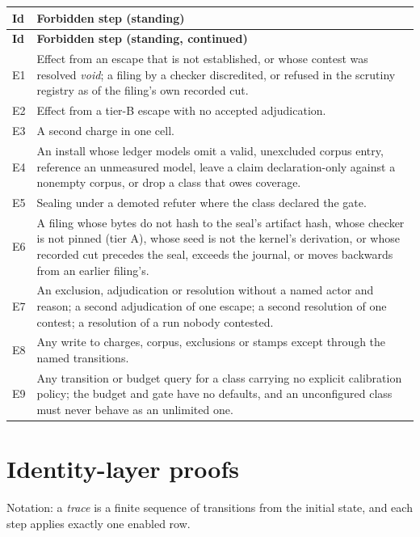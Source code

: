\documentclass[11pt,a4paper]{article}
\theoremstyle{plain}
\theoremstyle{definition}
\theoremstyle{remark}
\begin{document}
\begin{longtable}{@{}p{}p{}@{}}
\toprule
\textbf{Id} & \textbf{Forbidden step (standing)} \\
\midrule
\endfirsthead
\toprule
\textbf{Id} & \textbf{Forbidden step (standing, continued)} \\
\midrule
\endhead
E1 & Effect from an escape that is not established, or whose contest was resolved \emph{void}; a filing by a checker discredited, or refused in the scrutiny registry as of the filing's own recorded cut. \\
E2 & Effect from a tier-B escape with no accepted adjudication. \\
E3 & A second charge in one cell. \\
E4 & An install whose ledger models omit a valid, unexcluded corpus entry, reference an unmeasured model, leave a claim declaration-only against a nonempty corpus, or drop a class that owes coverage. \\
E5 & Sealing under a demoted refuter where the class declared the gate. \\
E6 & A filing whose bytes do not hash to the seal's artifact hash, whose checker is not pinned (tier A), whose seed is not the kernel's derivation, or whose recorded cut precedes the seal, exceeds the journal, or moves backwards from an earlier filing's. \\
E7 & An exclusion, adjudication or resolution without a named actor and reason; a second adjudication of one escape; a second resolution of one contest; a resolution of a run nobody contested. \\
E8 & Any write to charges, corpus, exclusions or stamps except through the named transitions. \\
E9 & Any transition or budget query for a class carrying no explicit calibration policy; the budget and gate have no defaults, and an unconfigured class must never behave as an unlimited one. \\
\bottomrule
\end{longtable}

\section{Identity-layer proofs}
\label{app:identity}

Notation: a \emph{trace} is a finite sequence of transitions from the initial state, and each step applies exactly one enabled row.
\end{document}
